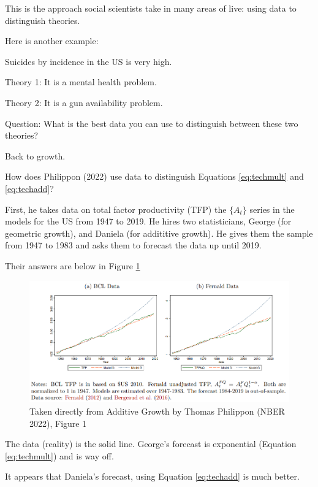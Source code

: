 \documentclass[
]{book}
\begin{document}
This is the approach social scientists take in many areas of live: using data to distinguish theories.

Here is another example:

Suicides by incidence in the US is very high.

Theory 1: It is a mental health problem.

Theory 2: It is a gun availability problem.

Question: What is the best data you can use to distinguish between these two theories?

Back to growth.

How does Philippon (2022) use data to distinguish Equations \eqref{eq:techmult} and \eqref{eq:techadd}?

First, he takes data on total factor productivity (TFP) the \(\{A_t\}\) series in the models for the US from 1947 to 2019. He hires two statisticians, George (for geometric growth), and Daniela (for addititive growth). He gives them the sample from 1947 to 1983 and asks them to forecast the data up until 2019.

Their answers are below in Figure \ref{fig:philipponfig1}

\begin{figure}

{\centering \includegraphics[width=1\linewidth]{img/growth2/philipponfig1} 

}

\caption{Taken directly from Additive Growth by Thomas Philippon (NBER 2022), Figure 1}\label{fig:philipponfig1}
\end{figure}

The data (reality) is the solid line. George's forecast is exponential (Equation \eqref{eq:techmult}) and is way off.

It appears that Daniela's forecast, using Equation \eqref{eq:techadd} is much better.
\end{document}
